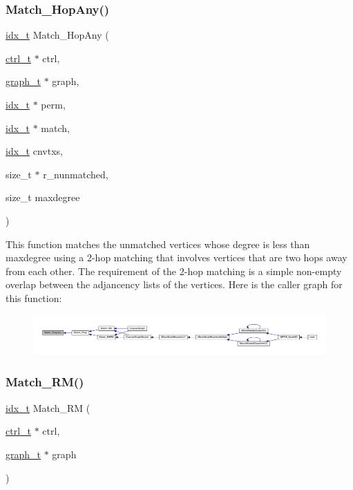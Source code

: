 \subsubsection{\texorpdfstring{Match\+\_\+Hop\+Any()}{Match\_2HopAny()}}
{\footnotesize\ttfamily \hyperlink{a00876_aaa5262be3e700770163401acb0150f52}{idx\+\_\+t} Match\+\_\+Hop\+Any (\begin{DoxyParamCaption}\item[{\hyperlink{a00742}{ctrl\+\_\+t} $\ast$}]{ctrl,  }\item[{\hyperlink{a00734}{graph\+\_\+t} $\ast$}]{graph,  }\item[{\hyperlink{a00876_aaa5262be3e700770163401acb0150f52}{idx\+\_\+t} $\ast$}]{perm,  }\item[{\hyperlink{a00876_aaa5262be3e700770163401acb0150f52}{idx\+\_\+t} $\ast$}]{match,  }\item[{\hyperlink{a00876_aaa5262be3e700770163401acb0150f52}{idx\+\_\+t}}]{cnvtxs,  }\item[{size\+\_\+t $\ast$}]{r\+\_\+nunmatched,  }\item[{size\+\_\+t}]{maxdegree }\end{DoxyParamCaption})}

This function matches the unmatched vertices whose degree is less than maxdegree using a 2-\/hop matching that involves vertices that are two hops away from each other. The requirement of the 2-\/hop matching is a simple non-\/empty overlap between the adjancency lists of the vertices. Here is the caller graph for this function\+:\nopagebreak
\begin{figure}[H]
\begin{center}
\leavevmode
\includegraphics[width=350pt]{a00945_a838a4013e3b5cc5278ecc7a8757ce0ef_icgraph}
\end{center}
\end{figure}
\mbox{\label{a00945_a892d2ea16d613abc2276ad5fc6999724}} 
\subsubsection{\texorpdfstring{Match\+\_\+\+R\+M()}{Match\_RM()}}
{\footnotesize\ttfamily \hyperlink{a00876_aaa5262be3e700770163401acb0150f52}{idx\+\_\+t} Match\+\_\+\+RM (\begin{DoxyParamCaption}\item[{\hyperlink{a00742}{ctrl\+\_\+t} $\ast$}]{ctrl,  }\item[{\hyperlink{a00734}{graph\+\_\+t} $\ast$}]{graph }\end{DoxyParamCaption})}

